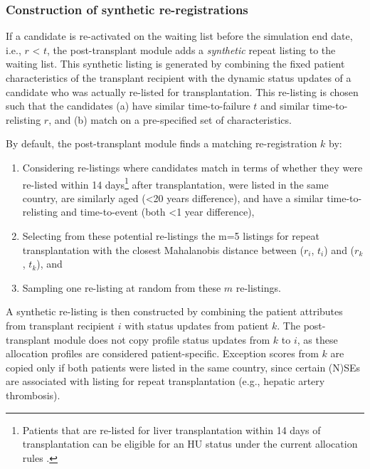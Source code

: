 \documentclass[11pt,twoside,]{book}
\let\rmarkdownfootnote\footnote%
\def\footnote{\protect\rmarkdownfootnote}
\begin{document}
\newpage

\subsubsection{Construction of synthetic re-registrations}\label{sec:elassynthreg}

If a candidate is re-activated on the waiting list before
the simulation end date, i.e., \(r\) \textless{} \(t\), the post-transplant module adds a \emph{synthetic} repeat
listing to the waiting list. This synthetic listing is
generated by combining the fixed patient characteristics of the transplant recipient
with the dynamic status updates of a candidate who was actually
re-listed for transplantation. This re-listing is chosen such that the candidates (a) have
similar time-to-failure \(t\) and similar time-to-relisting \(r\), and (b) match on
a pre-specified set of characteristics.

By default, the post-transplant module finds a matching re-registration
\(k\) by:

\begin{enumerate}
\def\labelenumi{\arabic{enumi}.}
\item
  Considering re-listings where candidates match in terms of whether
  they were re-listed within 14 days\footnote{Patients that are re-listed for liver
    transplantation within 14 days of transplantation can be eligible for an HU
    status under the current allocation rules \citep{ETLiverMan2025}.} after transplantation,
  were listed in the same country, are similarly aged (\textless20 years difference),
  and have a similar time-to-relisting and time-to-event (both \textless1 year difference),
\item
  Selecting from these potential re-listings the m=5 listings for repeat transplantation with the closest Mahalanobis
  distance between (\(r_i\), \(t_i\)) and (\(r_k\), \(t_k\)), and
\item
  Sampling one re-listing at random from these \(m\) re-listings.
\end{enumerate}

A synthetic re-listing is then constructed by combining the patient
attributes from transplant recipient \(i\) with status updates from patient \(k\).
The post-transplant module does not copy profile status updates from \(k\) to \(i\), as these allocation profiles are considered patient-specific. Exception scores from \(k\) are copied only if both patients were listed in the same country, since certain (N)SEs are associated with listing for repeat transplantation (e.g., hepatic artery thrombosis).
\end{document}
